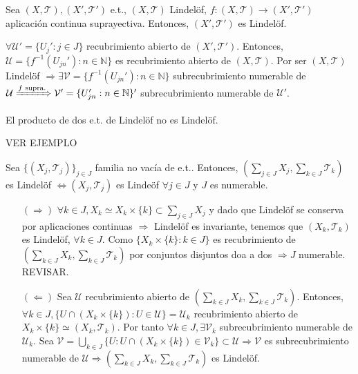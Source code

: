 \begin{prop}
  Sea $( X, \mathcal{T} ), ( X', \mathcal{T}' )$ e.t., $( X, \mathcal{T} )$ Lindelöf, $f : ( X, \mathcal{T} ) \to ( X', \mathcal{T}' )$ aplicación continua suprayectiva. Entonces, $( X', \mathcal{T}' )$ es Lindelöf.
\end{prop}

\begin{dem}
  $\forall \mathcal{U}' = \{ U_{j}' : j \in J \}$ recubrimiento abierto de $( X', \mathcal{T}' )$. Entonces, $ \mathcal{U} = \{  f^{-1}(U_{jn}') : n \in \mathbb{N} \}$ es recubrimiento abierto de $( X, \mathcal{T} )$. Por ser $( X, \mathcal{T} )$ Lindelöf $\Rightarrow \exists \mathcal{V} = \{  f^{-1}(U_{jn}') : n \in \mathbb{N} \}$ subrecubrimiento numerable de $\mathcal{U} \xRightarrow[]{ f \text{ supra.} } \mathcal{V}' = \{  U_{jn}' : n \in \mathbb{N} \}'$ subrecubrimiento numerable de $\mathcal{U}'$.
\end{dem}

\begin{obs}
  El producto de dos e.t. de Lindelöf no es Lindelöf.
\end{obs}

\begin{ejm}
  VER EJEMPLO
\end{ejm}

\begin{prop}
  Sea $\{ ( X_{j}, \mathcal{T}_{j} ) \}_{j \in J}$ familia no vacía de e.t.. Entonces, $( \sum_{j \in J} X_{j}, \sum_{k \in J} \mathcal{T}_{k})$ es Lindelöf $\Leftrightarrow ( X_{j}, \mathcal{T}_{j} )$ es Lindeöf $\forall j \in J$ y $J $ es numerable.
\end{prop}

\begin{dem}
  \begin{enumerate}[label=(\roman*)]
    \item []
    \item [$(\Rightarrow)$] $\forall k \in J, X_{k} \simeq X_{k} \times \{ k \} \subset \sum_{j \in J} X_{j}$ y dado que Lindelöf se conserva por aplicaciones continuas $\Rightarrow$ Lindelöf es invariante, tenemos que $( X_{k}, \mathcal{T}_{k} )$ es Lindelöf, $\forall k \in J$. Como $\{ X_{k} \times \{ k \} : k \in J \}$ es recubrimiento de $( \sum_{k \in J} X_{k}, \sum_{k \in J} \mathcal{T}_{k})$ por conjuntos disjuntos doa a dos $\Rightarrow J$ numerable. REVISAR.
    \item [$(\Leftarrow)$] Sea $\mathcal{U}$ recubrimiento abierto de $( \sum_{k \in J} X_{k}, \sum_{k \in J} \mathcal{T}_{k})$. Entonces, $\forall k \in J, \{  U \cap ( X_{k} \times \{ k \} ) :  U \in \mathcal{U} \} = \mathcal{U}_{k}$ recubrimiento abierto de $X_{k} \times \{ k \} \simeq ( X_{k}, \mathcal{T}_{k} )$. Por tanto $\forall k \in J, \exists \mathcal{V}_{k}$ subrecubrimiento numerable de $\mathcal{U}_{k}$. Sea $ \mathcal{V} = \bigcup_{k \in J} \{ U : U \cap ( X_{k} \times \{ k \} ) \in \mathcal{V}_{k} \} \subset \mathcal{U} \Rightarrow \mathcal{V}$ es subrecubrimiento numerable de $\mathcal{U} \Rightarrow ( \sum_{k \in J} X_{k}, \sum_{k \in J} \mathcal{T}_{k})$ es Lindelöf.
  \end{enumerate}
\end{dem}
